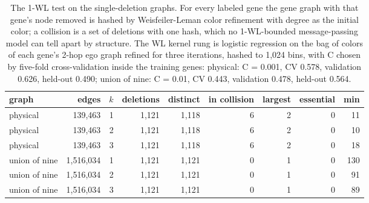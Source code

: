 \begin{table}[H]
  \centering
  \footnotesize
  \caption[The 1-WL test on the deletion graphs]{The 1-WL test on the single-deletion graphs. For every labeled gene the gene graph with that gene's node removed is hashed by Weisfeiler-Leman color refinement with degree as the initial color; a collision is a set of deletions with one hash, which no 1-WL-bounded message-passing model can tell apart by structure. The WL kernel rung is logistic regression on the bag of colors of each gene's 2-hop ego graph refined for three iterations, hashed to 1,024 bins, with C chosen by five-fold cross-validation inside the training genes: physical: C = 0.001, CV 0.578, validation 0.626, held-out 0.490; union of nine: C = 0.01, CV 0.443, validation 0.478, held-out 0.564.}
  \label{tab:wl}
  \begin{tabular}{@{}lrrrrrrrr@{}}
    \hline
    graph & edges & $k$ & deletions & distinct & in collision & largest & essential & min \\
    \hline
    physical & 139,463 & 1 & 1,121 & 1,118 & 6 & 2 & 0 & 11 \\
    physical & 139,463 & 2 & 1,121 & 1,118 & 6 & 2 & 0 & 10 \\
    physical & 139,463 & 3 & 1,121 & 1,118 & 6 & 2 & 0 & 18 \\
    union of nine & 1,516,034 & 1 & 1,121 & 1,121 & 0 & 1 & 0 & 130 \\
    union of nine & 1,516,034 & 2 & 1,121 & 1,121 & 0 & 1 & 0 & 91 \\
    union of nine & 1,516,034 & 3 & 1,121 & 1,121 & 0 & 1 & 0 & 89 \\
    \hline
  \end{tabular}
\end{table}
